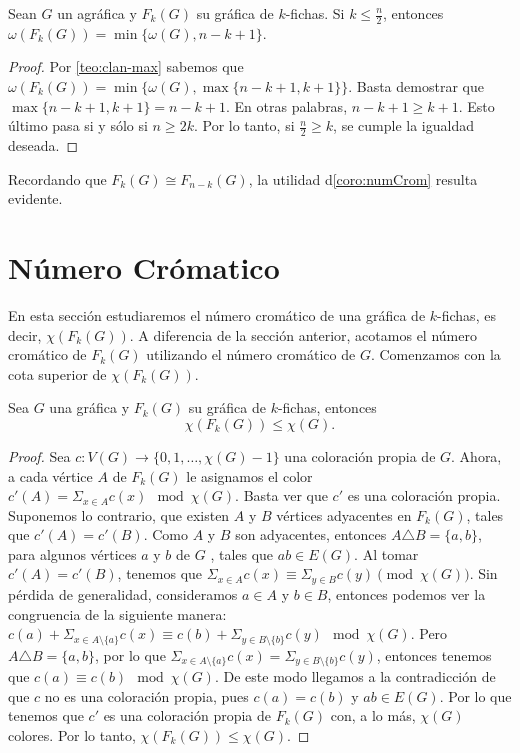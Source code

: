 \begin{corolario}
\label{coro:numCrom}
    Sean $G$ un agr\'afica y $F_k(G)$ su gr\'afica de $k$-fichas. Si $k \leq
    \frac{n}{2}$, entonces $\omega(F_k(G))= \min\{\omega(G), n-k+1\}$.
\end{corolario}

\begin{proof}
    Por \cref{teo:clan-max} sabemos que $\omega(F_k(G))= \min \{\omega(G), \max
    \{n-k+1,k+1\}\}$. Basta demostrar que $\max \{n-k+1, k+1\} = n-k+1$. En
    otras palabras, $n-k+1 \geq k+1$. Esto \'ultimo pasa si y s\'olo si $n \geq
    2k$. Por lo tanto, si $\frac{n}{2} \geq k$, se cumple la igualdad deseada.
\end{proof}

Recordando que $F_k(G) \cong F_{n-k}(G)$, la utilidad  d\cref{coro:numCrom}
resulta evidente.

\section{N\'umero Cr\'omatico}%
\label{sec:num cromatico}

En esta secci\'on estudiaremos el n\'umero crom\'atico de una gr\'afica de
$k$-fichas, es decir, $\chi (F_k(G))$. A diferencia de la secci\'on anterior,
acotamos el n\'umero crom\'atico de $F_k(G)$ utilizando el n\'umero crom\'atico
de $G$. Comenzamos con la cota superior de $ \chi (F_k(G))$.

\begin{teorema}
\label{teo:num cromatico de G y F(G)}
    Sea $G$ una gr\'afica y $F_k(G)$ su gr\'afica de $k$-fichas, entonces
    \[
        \chi(F_k(G)) \leq \chi (G).
    \]
\end{teorema}

\begin{proof}
    Sea $c \colon V(G) \to \{0,1, \dots, \chi(G)-1\}$ una coloraci\'on propia de
    $G$. Ahora, a cada v\'ertice $A$ de $F_k(G)$ le asignamos el color $ c'(A)=
    \Sigma_{x \in A}c(x) \mod \chi(G)$. Basta ver que $c'$ es una coloraci\'on
    propia. Suponemos lo contrario, que existen $A$ y $B$ v\'ertices adyacentes
    en $F_k(G)$, tales que $c'(A) = c'(B)$. Como $A$ y $B$ son adyacentes,
    entonces $A \triangle B = \{a,b\}$, para algunos v\'ertices $a$ y $b$ de $G$
    , tales que $ab \in E(G)$. Al tomar $c'(A) = c'(B)$, tenemos que $\Sigma_{x
    \in A}c(x) \equiv \Sigma_{y \in B}c(y) \pmod {\chi(G)}$. Sin p\'erdida de
    generalidad, consideramos $a \in A$ y $b \in B$, entonces podemos ver la
    congruencia de la siguiente manera: $c(a) + \Sigma_{x \in A
    \setminus\{a\}}c(x) \equiv c(b) + \Sigma_{y \in B\setminus\{b\}}c(y) \mod
    \chi(G)$. Pero $A \triangle B = \{a,b\}$, por lo que $\Sigma_{x \in
    A\setminus\{a\}}c(x)=\Sigma_{y \in B\setminus\{b\}}c(y)$, entonces tenemos
    que $c(a) \equiv c(b) \mod \chi(G)$. De este modo llegamos a la
    contradicci\'on de que $c$ no es una coloraci\'on propia, pues $c(a) = c(b)$
    y $ab \in E(G)$. Por lo que tenemos que $c'$ es una coloraci\'on propia de
    $F_k(G)$ con, a lo m\'as, $\chi (G)$ colores. Por lo tanto, $\chi(F_k(G))
    \leq \chi (G)$.
\end{proof}


